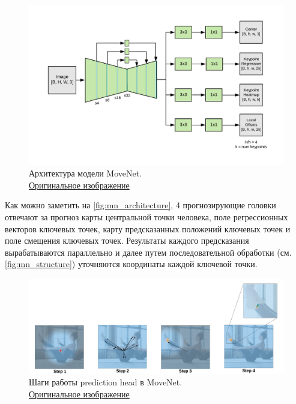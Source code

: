 \begin{figure}[h]
	\centering
	\includegraphics[width=\textwidth * 4 / 5]{./images/MoveNet/architecture}
	\caption{Архитектура модели MoveNet.\\ \href{https://1.bp.blogspot.com/-GvLNT9SFGJ8/YJ7qxvGTsDI/AAAAAAAAENE/J-nRn34k48UbDpMhPvjX1RG66WX1IsppwCLcBGAsYHQ/s0/MoveNetArchitecture\%2B\%25281\%2529.png}{Оригинальное изображение}}
	\label{fig:mn_architecture}
\end{figure}

Как можно заметить на \autoref{fig:mn_architecture}, 4 прогнозирующие головки отвечают за прогноз карты центральной точки человека, поле регрессионных векторов ключевых точек, карту предсказанных положений ключевых точек и поле смещения ключевых точек. Результаты каждого предсказания вырабатываются параллельно и далее путем последовательной обработки (см. \autoref{fig:mn_structure}) уточняются координаты каждой ключевой точки.

\begin{figure}[h]
	\centering
	\includegraphics[width=\textwidth * 4 / 5]{./images/MoveNet/structure}
	\caption{Шаги работы prediction head в MoveNet.\\ \href{https://1.bp.blogspot.com/-Qq7pj5W-zeg/YJ6xVtNDQjI/AAAAAAAAEMs/pbxSPz0jZWE3Koq3AoZDs2CE7urcxfghwCLcBGAsYHQ/s0/MoveNetPostProcessing.png}{Оригинальное изображение}}
	\label{fig:mn_structure}
\end{figure}

